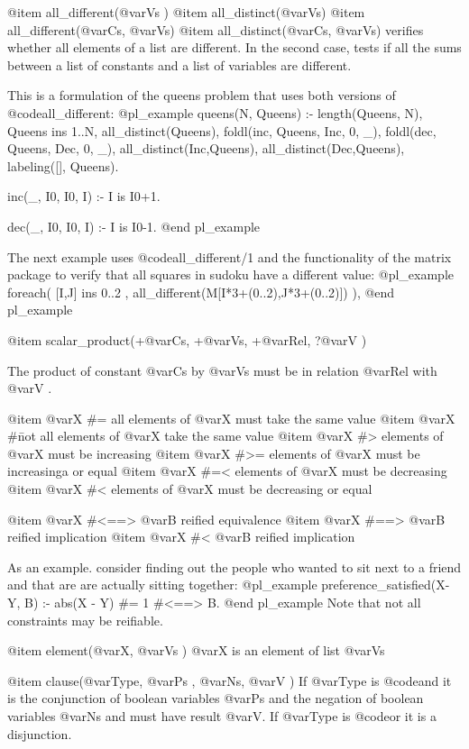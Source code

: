 @item all_different(@var{Vs}    )
@item all_distinct(@var{Vs})
@item all_different(@var{Cs}, @var{Vs})
@item all_distinct(@var{Cs}, @var{Vs})
 verifies whether all elements of a list are different. In the second
case, tests if all the sums between a list of constants and a list of
variables are different.

This is a formulation of the queens problem that uses both versions of @code{all_different}:
@pl_example
queens(N, Queens) :-
    length(Queens, N),
    Queens ins 1..N,
    all_distinct(Queens),
    foldl(inc, Queens, Inc, 0, _), %
    foldl(dec, Queens, Dec, 0, _), %
    all_distinct(Inc,Queens),
    all_distinct(Dec,Queens),
    labeling([], Queens).

inc(_, I0, I0, I) :-
    I is I0+1.

dec(_, I0, I0, I) :-
    I is I0-1.
@end pl_example


The next example uses @code{all_different/1} and the functionality of the matrix package to verify that all squares in
sudoku have a different value:
@pl_example
    foreach( [I,J] ins 0..2 ,
           all_different(M[I*3+(0..2),J*3+(0..2)]) ),
@end pl_example

@item scalar_product(+@var{Cs}, +@var{Vs}, +@var{Rel}, ?@var{V}    )

The product of constant @var{Cs} by @var{Vs} must be in relation
@var{Rel} with @var{V} .

@item @var{X} #= 
all elements of @var{X}  must take the same value
@item @var{X} #\= 
not all elements of @var{X}  take the same value
@item @var{X} #> 
elements of @var{X}  must be increasing
@item @var{X} #>= 
elements of @var{X}  must be increasinga or equal
@item @var{X} #=< 
elements of @var{X}  must be decreasing
@item @var{X} #< 
elements of @var{X}  must be decreasing or equal


@item @var{X} #<==> @var{B}
reified equivalence
@item @var{X} #==> @var{B}
reified implication
@item @var{X} #< @var{B}
reified implication 

As an example. consider finding out the people who wanted to sit
next to a friend and that are are actually sitting together:
@pl_example
preference_satisfied(X-Y, B) :-
    abs(X - Y) #= 1 #<==> B.
@end pl_example
Note that not all constraints may be reifiable.

@item element(@var{X}, @var{Vs}    )
@var{X} is an element of list @var{Vs}

@item clause(@var{Type}, @var{Ps} , @var{Ns}, @var{V}     )
If @var{Type} is @code{and} it is the conjunction of boolean variables
@var{Ps} and the negation of boolean variables @var{Ns} and must have
result @var{V}. If @var{Type} is @code{or} it is a disjunction.

